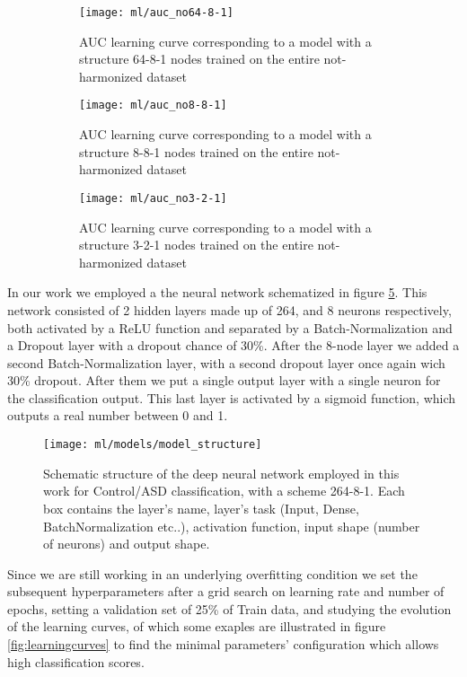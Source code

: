 \documentclass[10pt]{report}
\begin{document}
\begin{figure}
\centering
\begin{subfigure}[b]{0.3\textwidth}
   \texttt{[image: ml/auc\_no64-8-1]}
   \caption{AUC learning curve corresponding to a model with a structure 64-8-1 nodes trained on the entire not-harmonized dataset}
   \label{fig:auc_no64-8-1}
\end{subfigure}
\begin{subfigure}[b]{0.3\textwidth}
   \texttt{[image: ml/auc\_no8-8-1]}
   \caption{AUC learning curve corresponding to a model with a structure 8-8-1 nodes trained on the entire not-harmonized dataset}
   \label{fig:auc_no8-8-1}
\end{subfigure}
\begin{subfigure}[b]{0.3\textwidth}
   \texttt{[image: ml/auc\_no3-2-1]}
   \caption{AUC learning curve corresponding to a model with a structure 3-2-1 nodes trained on the entire not-harmonized dataset}
   \label{fig:auc_no3-2-1}
\end{subfigure}
\caption{}
\label{fig:learningcurve}
\end{figure}


In our work we employed a the neural network schematized in figure \ref{fig:model_structure}.
This network consisted of 2 hidden layers made up of 264, and 8 neurons respectively, both activated by a ReLU function and separated by a Batch-Normalization and a Dropout layer with a dropout chance of 30\%.
After the 8-node layer we added a second Batch-Normalization layer, with a second dropout layer once again wich 30\% dropout.
After them we put a single output layer with a single neuron for the classification output.
This last layer is activated by a sigmoid function, which outputs a real number between 0 and 1.



\begin{figure}[h!]
\centering
\texttt{[image: ml/models/model\_structure]}
\caption{Schematic structure of the deep neural network employed in this work for Control/ASD classification, with a scheme 264-8-1.
Each box contains the layer's name, layer's task (Input, Dense, BatchNormalization etc..), activation function, input shape (number of neurons) and output shape.}
\label{fig:model_structure}
\end{figure}


Since we are still working in an underlying overfitting condition we set the subsequent hyperparameters after a grid search on learning rate and number of epochs, setting a validation set of 25\% of Train data, and studying the evolution of the learning curves, of which some exaples are illustrated in figure \ref{fig:learningcurves} to find the minimal parameters' configuration which allows high classification scores.
\end{document}
